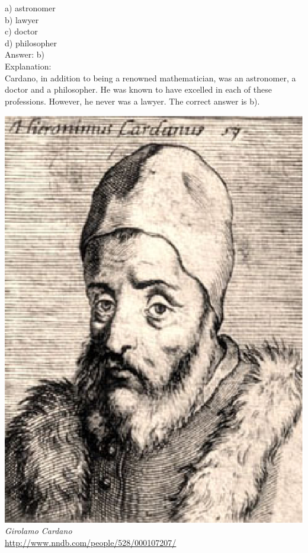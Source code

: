 \documentclass[letterpaper, 12pt]{article}
\begin{document}
a) astronomer\\
b) lawyer\\
c) doctor\\
d) philosopher\\

Answer: b)\\

Explanation:\\
Cardano, in addition to being a renowned mathematician, was an astronomer, a doctor and a philosopher. He was known to have excelled in each of these professions. However, he never was a lawyer. The correct answer is b).\\
\begin{center}
\includegraphics[scale=0.25]{Cardano.eps}\\
\emph{{\small Girolamo Cardano}}\\
\href{http://www.nndb.com/people/528/000107207/}{http://www.nndb.com/people/528/000107207/}\\[5mm]
\end{center}
\end{document}
